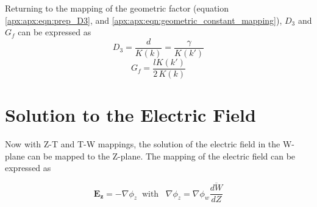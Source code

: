  
 
 
 \noindent Returning to the mapping of the geometric factor (equation \ref{apx:apx:eqn:prep_D3}, and \ref{apx:apx:eqn:geometric_constant_mapping}), $D_3$ and $G_f$ can be expressed as
 \begin{equation}
     D_3 = \frac{d}{K(k)} = \frac{\gamma}{K(k')}
     \label{apx:apx:eqn:D3}
 \end{equation}
 \begin{equation}
     G_f = \frac{lK(k')}{2\,K(k)}
     \label{apx:apx:eqn:Gf}
 \end{equation}
 
 \section{Solution to the Electric Field}
 \label{apx:apx:app:analytic_electric_field}
 
 \par Now with Z-T and T-W mappings, the solution of the electric field in the W-plane can be mapped to the Z-plane. The mapping of the electric field can be expressed as 
 
 \begin{equation}
     \boldsymbol{E_z} = -\nabla \phi_z \;\;\text{with} \;\;\;\nabla \phi_z = \nabla \phi_w \overline{\frac{dW}{dZ}}
     \label{apx:apx:eqn:ZtoW_efield}
 \end{equation}
 
